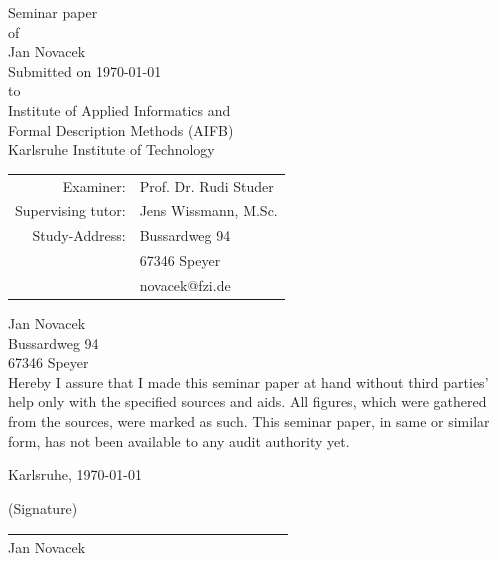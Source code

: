 \begin{titlepage}
\begin{center}
Seminar paper\\
\vspace*{.5cm}
of\\
\vspace*{.5cm}
{\LARGE Jan Novacek}
\\
\vspace{1,5cm}
Submitted on \today  
\vspace{.5cm}
\\ to
\vspace{.5cm}
\\ Institute of Applied Informatics and 
\\Formal Description Methods (AIFB)
\\  Karlsruhe Institute of Technology 
\\\vspace{1.5cm}
\begin{tabular}{rl}
Examiner: & Prof. Dr. Rudi Studer
\\Supervising tutor: & Jens Wissmann, M.Sc. 
\\[3ex] Study-Address:
  & Bussardweg 94
\\& 67346 Speyer
\\& novacek@fzi.de
\end{tabular}
\end{center}
\end{titlepage}



\newpage



\text{ }
\vspace{13.5cm}


Jan Novacek\\
Bussardweg 94\\
67346 Speyer\\

Hereby I assure that I made this seminar paper at hand without third parties' help only with the specified sources and
aids. All figures, which were gathered from the sources, were marked as such. This seminar paper, in same or similar
form, has not been available to any audit authority yet.

Karlsruhe, \today\\
\medskip
\medskip

(Signature)\\
\underline{~~~~~~~~~~~~~~~~~~~~~~~~~~~~~~~~~~~~~~~~}\\
Jan Novacek\\



\newpage


